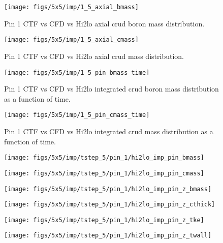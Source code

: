 \begin{figure}[H]
    \centering
    \texttt{[image: figs/5x5/imp/1\_5\_axial\_bmass]}
    \caption{Pin 1 CTF vs CFD vs Hi2lo axial crud boron mass distribution.}
    \label{fig:15axialbmass}
\end{figure}
\begin{figure}[H]
    \centering
    \texttt{[image: figs/5x5/imp/1\_5\_axial\_cmass]}
    \caption{Pin 1 CTF vs CFD vs Hi2lo axial crud mass distribution.}
    \label{fig:15axialcmass}
\end{figure}
\begin{figure}[H]
    \centering
    \texttt{[image: figs/5x5/imp/1\_5\_pin\_bmass\_time]}
    \caption{Pin 1 CTF vs CFD vs Hi2lo integrated crud boron mass distribution as a function of time.}
    \label{fig:15pinbmasstime}
\end{figure}
\begin{figure}[H]
    \centering
    \texttt{[image: figs/5x5/imp/1\_5\_pin\_cmass\_time]}
    \caption{Pin 1 CTF vs CFD vs Hi2lo integrated crud mass distribution as a function of time.}
    \label{fig:15pincmasstime}
\end{figure}

\begin{figure}[H]
    \centering
    \texttt{[image: figs/5x5/imp/tstep\_5/pin\_1/hi2lo\_imp\_pin\_bmass]}
    \caption{}
    \label{fig:hi2loimppinbmass}
\end{figure}
\begin{figure}[H]
    \centering
    \texttt{[image: figs/5x5/imp/tstep\_5/pin\_1/hi2lo\_imp\_pin\_cmass]}
    \caption{}
    \label{fig:hi2loimppincmass}
\end{figure}
\begin{figure}[H]
    \centering
    \texttt{[image: figs/5x5/imp/tstep\_5/pin\_1/hi2lo\_imp\_pin\_z\_bmass]}
    \caption{}
    \label{fig:hi2loimppinzbmass}
\end{figure}
\begin{figure}[H]
    \centering
    \texttt{[image: figs/5x5/imp/tstep\_5/pin\_1/hi2lo\_imp\_pin\_z\_cthick]}
    \caption{}
    \label{fig:hi2loimppinzcthick}
\end{figure}
\begin{figure}[H]
    \centering
    \texttt{[image: figs/5x5/imp/tstep\_5/pin\_1/hi2lo\_imp\_pin\_z\_tke]}
    \caption{}
    \label{fig:hi2loimppinztke}
\end{figure}
\begin{figure}[H]
    \centering
    \texttt{[image: figs/5x5/imp/tstep\_5/pin\_1/hi2lo\_imp\_pin\_z\_twall]}
    \caption{}
    \label{fig:hi2loimppinztwall}
\end{figure}

